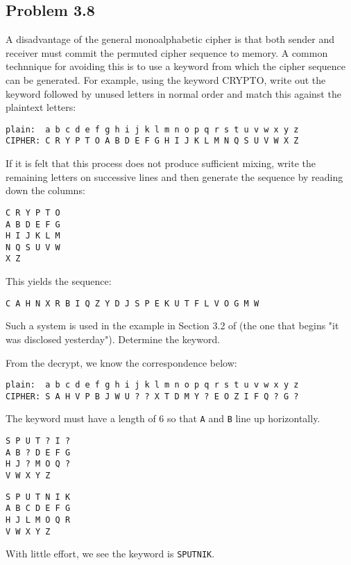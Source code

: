 \documentclass[../hw_sols.tex]{subfiles}
\begin{document}
\subsection*{Problem 3.8}

A disadvantage of the general monoalphabetic cipher is that both sender and 
receiver must commit the permuted cipher sequence to memory. A common 
technnique for avoiding this is to use a keyword from which the cipher 
sequence can be generated. For example, using the keyword CRYPTO, write out 
the keyword followed by unused letters in normal order and match this against 
the plaintext letters:
\begin{Verbatim}
plain:  a b c d e f g h i j k l m n o p q r s t u v w x y z
CIPHER: C R Y P T O A B D E F G H I J K L M N Q S U V W X Z
\end{Verbatim}

If it is felt that this process does not produce sufficient mixing, write the 
remaining letters on successive lines and then generate the sequence by 
reading down the columns:
\begin{Verbatim}[xleftmargin=3cm]
C R Y P T O
A B D E F G
H I J K L M
N Q S U V W
X Z
\end{Verbatim}

This yields the sequence:
\begin{Verbatim}
C A H N X R B I Q Z Y D J S P E K U T F L V O G M W
\end{Verbatim}

Such a system is used in the example in Section 3.2 of \cite{textbook} 
(the one that begins "it was disclosed yesterday"). Determine the keyword.

\begin{solution}

From the decrypt, we know the correspondence below:
\begin{Verbatim}
plain:  a b c d e f g h i j k l m n o p q r s t u v w x y z
CIPHER: S A H V P B J W U ? ? X T D M Y ? E O Z I F Q ? G ?	
\end{Verbatim}

The keyword must have a length of 6 so that \verb|A| and \verb|B| 
line up horizontally.

\begin{minipage}{0.2\linewidth}
\begin{Verbatim}
S P U T ? I ?
A B ? D E F G
H J ? M O Q ?
V W X Y Z    
\end{Verbatim}
\end{minipage}
\qquad {\Huge $\Rightarrow$} \qquad
\begin{minipage}{0.2\linewidth}
\begin{Verbatim}
S P U T N I K
A B C D E F G
H J L M O Q R
V W X Y Z
\end{Verbatim}
\end{minipage}

With little effort, we see the keyword is \verb|SPUTNIK|.

\end{solution}
\end{document}
